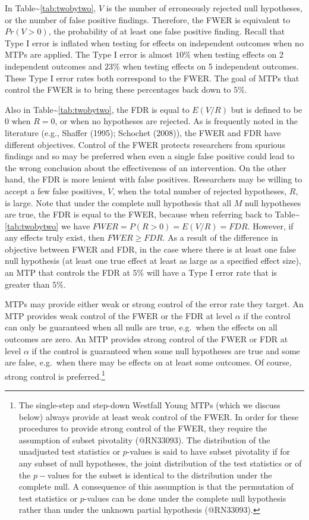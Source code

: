 \documentclass[
]{article}
\begin{document}
In Table\textasciitilde{}\ref{tab:twobytwo}, \(V\) is the number of
erroneously rejected null hypotheses, or the number of false positive
findings. Therefore, the FWER is equivalent to \(Pr(V > 0)\), the
probability of at least one false positive finding. Recall that Type I
error is inflated when testing for effects on independent outcomes when
no MTPs are applied. The Type I error is almost \(10\%\) when testing
effects on 2 independent outcomes and \(23\%\) when testing effects on 5
independent outcomes. These Type I error rates both correspond to the
FWER. The goal of MTPs that control the FWER is to bring these
percentages back down to \(5\%\).

Also in Table\textasciitilde{}\ref{tab:twobytwo}, the FDR is equal to
\(E(V/R)\) but is defined to be \(0\) when \(R=0\), or when no
hypotheses are rejected. As is frequently noted in the literature (e.g.,
Shaffer (1995); Schochet (2008)), the FWER and FDR have different
objectives. Control of the FWER protects researchers from spurious
findings and so may be preferred when even a single false positive could
lead to the wrong conclusion about the effectiveness of an intervention.
On the other hand, the FDR is more lenient with false positives.
Researchers may be willing to accept a few false positives, \(V\), when
the total number of rejected hypotheses, \(R\), is large. Note that
under the complete null hypothesis that all \(M\) null hypotheses are
true, the FDR is equal to the FWER, because when referring back to
Table\textasciitilde{}\ref{tab:twobytwo} we have
\(FWER=P(R>0)=E(V/R)=FDR\). However, if any effects truly exist, then
\(FWER \geq FDR\). As a result of the difference in objective between
FWER and FDR, in the case where there is at least one false null
hypothesis (at least one true effect at least as large as a specified
effect size), an MTP that controls the FDR at \(5\%\) will have a Type I
error rate that is greater than \(5\%\).

MTPs may provide either weak or strong control of the error rate they
target. An MTP provides weak control of the FWER or the FDR at level
\(\alpha\) if the control can only be guaranteed when all nulls are
true, e.g.~when the effects on all outcomes are zero. An MTP provides
strong control of the FWER or FDR at level \(\alpha\) if the control is
guaranteed when some null hypotheses are true and some are false,
e.g.~when there may be effects on at least some outcomes. Of course,
strong control is
preferred.\footnote{The single-step and step-down Westfall Young MTPs (which we discuss below) always provide at least weak control of the FWER.
In order for these procedures to provide strong control of the FWER, they require the assumption of subset pivotality (@RN33093).
The distribution of the unadjusted test statistics or $p$-values is said to have subset pivotality if for any subset of null hypotheses, the joint distribution of the test statistics or of the $p-$values for the subset is identical to the distribution under the complete null.
A consequence of this assumption is that the permutation of test statistics or $p$-values can be done under the complete null hypothesis rather than under the unknown partial hypothesis (@RN33093).}
\end{document}
